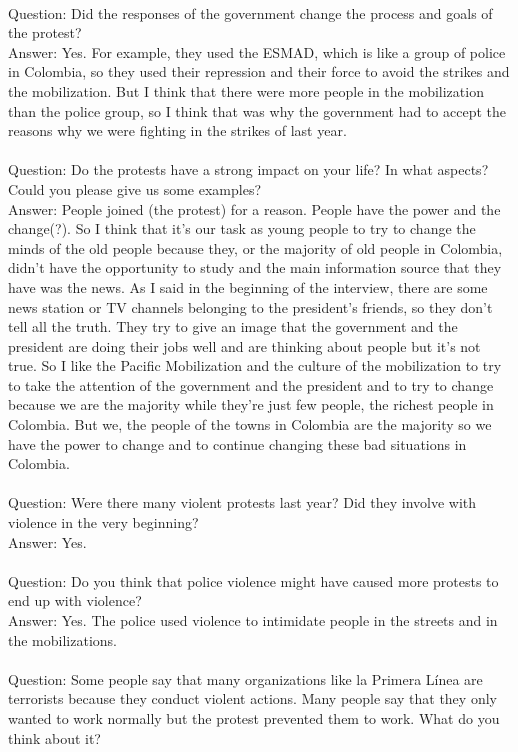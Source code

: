 \documentclass{phyasgn}\usepackage{nag}
\begin{document}
\\
Question: Did the responses of the government change the process and goals of the protest?\\
Answer: Yes. For example, they used the ESMAD, which is like a group of police in Colombia, so they used their repression and their force to avoid the strikes and the mobilization. But I think that there were more people in the mobilization than the police group, so I think that was why the government had to accept the reasons why we were fighting in the strikes of last year. \\
\\
Question: Do the protests have a strong impact on your life? In what aspects? Could you please give us some examples?\\
Answer: People joined (the protest) for a reason. People have the power and the change(?). So I think that it’s our task as young people to try to change the minds of the old people because they, or the majority of old people in Colombia, didn’t have the opportunity to study and the main information source that they have was the news. As I said in the beginning of the interview, there are some news station or TV channels belonging to the president’s friends, so they don’t tell all the truth. They try to give an image that the government and the president are doing their jobs well and are thinking about people but it’s not true. So I like the Pacific Mobilization and the culture of the mobilization to try to take the attention of the government and the president and to try to change because we are the majority while they’re just few people, the richest people in Colombia. But we, the people of the towns in Colombia are the majority so we have the power to change and to continue changing these bad situations in Colombia. \\
\\
Question: Were there many violent protests last year? Did they involve with violence in the very beginning?\\
Answer: Yes.\\
\\
Question: Do you think that police violence might have caused more protests to end up with violence?\\
Answer: Yes. The police used violence to intimidate people in the streets and in the mobilizations.\\
\\
Question: Some people say that many organizations like la Primera Línea are terrorists because they conduct violent actions. Many people say that they only wanted to work normally but the protest prevented them to work. What do you think about it?\\
\end{document}
